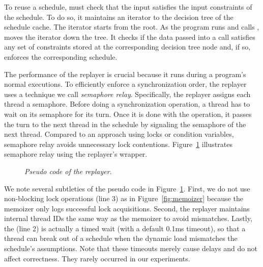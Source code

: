 To reuse a schedule, \tern must check that the input satisfies the input
constraints of the schedule.  To do so, it maintains an iterator to the
decision tree of the schedule cache.  The iterator starts from the root.
As the program runs and calls , \tern moves the iterator down
the tree.  It checks if the data passed into a  call
satisfies any set of constraints stored at the corresponding decision tree
node and, if so, enforces the corresponding schedule.
 
The performance of the replayer is crucial because it runs during a
program's normal executions.  To efficiently enforce a synchronization
order, the replayer uses a technique we call \emph{semaphore relay}.
Specifically, the replayer assigns each thread a semaphore.  Before doing
a synchronization operation, a thread has to wait on its semaphore for its
turn.  Once it is done with the operation, it passes the turn to the next
thread in the schedule by signaling the semaphore of the next thread.
Compared to an approach using locks or condition variables, semaphore
relay avoids unnecessary lock contentions.  Figure~\ref{fig:replayer}
illustrates semaphore relay using the replayer's
 wrapper.

\begin{figure}[t]
\begin{minipage}[c]{.8\linewidth}
\tiny {}
\end{minipage}
\caption{\small \emph{Pseudo code of the replayer}.}
\label{fig:replayer}
\vspace{-.2in}
\end{figure}

We note several subtleties of the pseudo code in
Figure~\ref{fig:replayer}.  First, we do not use non-blocking lock
operations (line 3) as in Figure~\ref{fig:memoizer} because the memoizer only logs successful lock
acquisitions.  Second, the replayer maintains internal thread IDs the same
way as the memoizer to avoid mismatches.  Lastly, the  (line 2)
is actually a timed wait (with a default 0.1ms timeout), so that a
thread can break out of a schedule when the dynamic load mismatches the
schedule's assumptions.  Note that these timeouts merely cause delays and
do not affect correctness.  They rarely occurred in our experiments.






